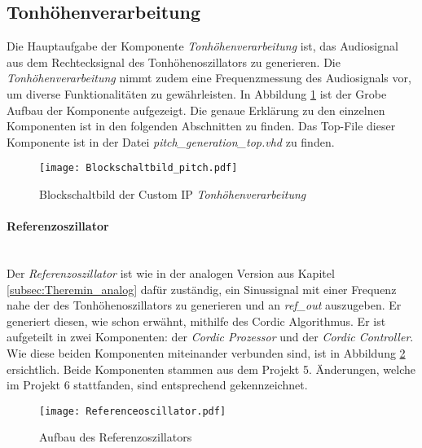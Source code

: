 \subsection{Tonhöhenverarbeitung}\label{subsec:Pitch_Generation}

Die Hauptaufgabe der Komponente \textit{Tonhöhenverarbeitung} ist, das Audiosignal aus dem Rechtecksignal des Tonhöhenoszillators zu generieren. Die \textit{Tonhöhenverarbeitung} nimmt zudem eine Frequenzmessung des Audiosignals vor, um diverse Funktionalitäten zu gewährleisten. In Abbildung \ref{img:Blockschaltbild_pitch} ist der Grobe Aufbau der Komponente aufgezeigt. Die genaue Erklärung zu den einzelnen Komponenten ist in den folgenden Abschnitten zu finden. Das Top-File dieser Komponente ist in der Datei \textit{pitch\_generation\_top.vhd} zu finden.


\begin{figure}[h!]
	\centering
	\texttt{[image: Blockschaltbild\_pitch.pdf]}
	\caption{Blockschaltbild der Custom IP \textit{Tonhöhenverarbeitung}} 
	\label{img:Blockschaltbild_pitch}
\end{figure}  



\paragraph{Referenzoszillator}\mbox{}\\

Der \textit{Referenzoszillator} ist wie in der analogen Version aus Kapitel \ref{subsec:Theremin_analog} dafür zuständig, ein Sinussignal mit einer Frequenz nahe der des Tonhöhenoszillators zu generieren und an \textit{ref\_out} auszugeben. Er generiert diesen, wie schon erwähnt, mithilfe des Cordic Algorithmus. Er ist aufgeteilt in zwei Komponenten: der \textit{Cordic Prozessor} und der \textit{Cordic Controller}. Wie diese beiden Komponenten miteinander verbunden sind, ist in Abbildung \ref{img:Referenceoscillator} ersichtlich. Beide Komponenten stammen aus dem Projekt 5. Änderungen, welche im Projekt 6 stattfanden, sind entsprechend gekennzeichnet. \\

\begin{figure}[t]
	\centering
	\texttt{[image: Referenceoscillator.pdf]}
	\caption{Aufbau des Referenzoszillators} 
	\label{img:Referenceoscillator}
\end{figure}  

